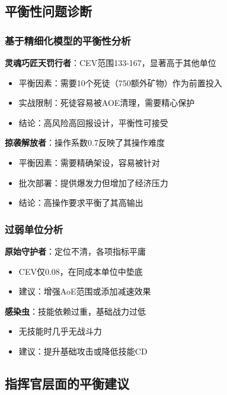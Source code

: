 \documentclass[a4paper,12pt]{article}
\begin{document}
\subsection{平衡性问题诊断}

\subsubsection{基于精细化模型的平衡性分析}
\textbf{灵魂巧匠天罚行者}：CEV范围133-167，显著高于其他单位
\begin{itemize}
\item 平衡因素：需要10个死徒（750额外矿物）作为前置投入
\item 实战限制：死徒容易被AOE清理，需要精心保护
\item 结论：高风险高回报设计，平衡性可接受
\end{itemize}

\textbf{掠袭解放者}：操作系数0.7反映了其操作难度
\begin{itemize}
\item 平衡因素：需要精确架设，容易被针对
\item 批次部署：提供爆发力但增加了经济压力
\item 结论：高操作要求平衡了其高输出
\end{itemize}

\subsubsection{过弱单位分析}
\textbf{原始守护者}：定位不清，各项指标平庸
\begin{itemize}
\item CEV仅0.08，在同成本单位中垫底
\item 建议：增强AoE范围或添加减速效果
\end{itemize}

\textbf{感染虫}：技能依赖过重，基础战力过低
\begin{itemize}
\item 无技能时几乎无战斗力
\item 建议：提升基础攻击或降低技能CD
\end{itemize}

\subsection{指挥官层面的平衡建议}
\end{document}
